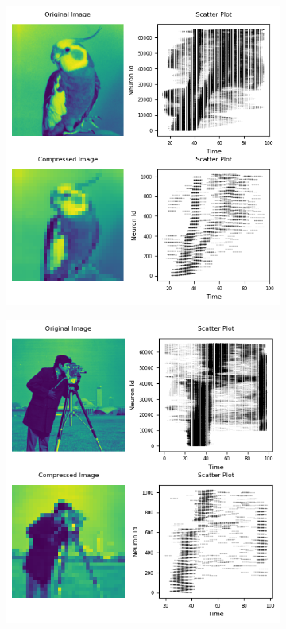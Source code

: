 \documentclass[12pt]{article}
\begin{document}
\begin{figure}[H]
\centering
  \begin{subfigure}[b]{0.45\textwidth}
    \includegraphics[width=\textwidth]{Figs/nc_bird.png}
  \end{subfigure}
  \hfill
  \begin{subfigure}[b]{0.45\textwidth}
    \includegraphics[width=\textwidth]{Figs/nc_cam.png}

\end{subfigure}
\end{figure}
\end{document}
